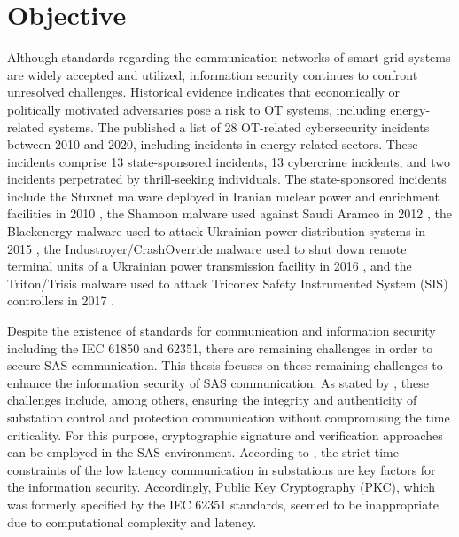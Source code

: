 \section{Objective}
\label{sec:introduction:objective}
Although standards regarding the communication networks of smart grid systems are widely accepted and utilized, information security continues to confront unresolved challenges.
Historical evidence indicates that economically or politically motivated adversaries pose a risk to OT systems, including energy-related systems.
The \citeauthor{canada2021} \cite{canada2021} published a list of 28 OT-related cybersecurity incidents between 2010 and 2020, including incidents in energy-related sectors.
These incidents comprise 13 state-sponsored incidents, 13 cybercrime incidents, and two incidents perpetrated by thrill-seeking individuals.
The state-sponsored incidents include the Stuxnet malware deployed in Iranian nuclear power and enrichment facilities in 2010 \cite{bbc2010}, the Shamoon malware used against Saudi Aramco in 2012 \cite{reuters2012}, the Blackenergy malware used to attack Ukrainian power distribution systems in 2015 \cite{cisa2021a}, the Industroyer/CrashOverride malware used to shut down remote terminal units of a Ukrainian power transmission facility in 2016 \cite{reuters2016,cisa2021b}, and the Triton/Trisis malware used to attack Triconex Safety Instrumented System (SIS) controllers in 2017 \cite{johnson2017}.

Despite the existence of standards for communication and information security including the IEC 61850 and 62351, there are remaining challenges in order to secure SAS communication.
This thesis focuses on these remaining challenges to enhance the information security of SAS communication.
As stated by \citeauthor{Ishchenko2018} \cite{Ishchenko2018}, these challenges include, among others, ensuring the integrity and authenticity of substation control and protection communication without compromising the time criticality.
For this purpose, cryptographic signature and verification approaches can be employed in the SAS environment.
According to \citeauthor{Elbez2019} \cite{Elbez2019}, the strict time constraints of the low latency communication in substations are key factors for the information security.
Accordingly, Public Key Cryptography (PKC), which was formerly specified by the IEC 62351 standards, seemed to be inappropriate due to computational complexity and latency.

